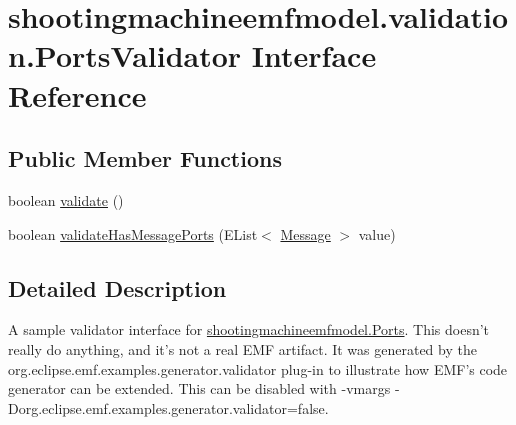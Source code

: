 \hypertarget{interfaceshootingmachineemfmodel_1_1validation_1_1_ports_validator}{\section{shootingmachineemfmodel.\-validation.\-Ports\-Validator Interface Reference}
\label{interfaceshootingmachineemfmodel_1_1validation_1_1_ports_validator}
}
\subsection*{Public Member Functions}
\begin{DoxyCompactItemize}
\item 
boolean \hyperlink{interfaceshootingmachineemfmodel_1_1validation_1_1_ports_validator_a4650a6d36c7ac6704b61f9e910791f23}{validate} ()
\item 
boolean \hyperlink{interfaceshootingmachineemfmodel_1_1validation_1_1_ports_validator_a64d0efc8e8f1895e3d5bb382144dee22}{validate\-Has\-Message\-Ports} (E\-List$<$ \hyperlink{interfaceshootingmachineemfmodel_1_1_message}{Message} $>$ value)
\end{DoxyCompactItemize}


\subsection{Detailed Description}
A sample validator interface for \hyperlink{interfaceshootingmachineemfmodel_1_1_ports}{shootingmachineemfmodel.\-Ports}. This doesn't really do anything, and it's not a real E\-M\-F artifact. It was generated by the org.\-eclipse.\-emf.\-examples.\-generator.\-validator plug-\/in to illustrate how E\-M\-F's code generator can be extended. This can be disabled with -\/vmargs -\/\-Dorg.\-eclipse.\-emf.\-examples.\-generator.\-validator=false. 

